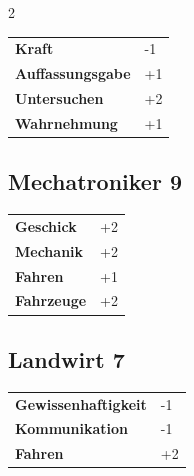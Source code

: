 \begin{multicols}{2}
\begin{tcolorbox}
\begin{tabular}{@{}ll@{}}
    \textbf{Kraft} & -1\\
    \textbf{Auffassungsgabe} & +1\\
    \textbf{Untersuchen} & +2\\
    \textbf{Wahrnehmung} & +1\\
\end{tabular}


\end{tcolorbox}

\begin{tcolorbox}
    \subsection*{Mechatroniker \hfill \small{9 }}
    \tcblower




\begin{tabular}{@{}ll@{}}
    \textbf{Geschick} & +2\\
    \textbf{Mechanik} & +2\\
    \textbf{Fahren} & +1\\
    \textbf{Fahrzeuge} & +2\\
\end{tabular}


\end{tcolorbox}

\begin{tcolorbox}
    \subsection*{Landwirt \hfill \small{7 }}
    \tcblower




\begin{tabular}{@{}ll@{}}
    \textbf{Gewissenhaftigkeit} & -1\\
    \textbf{Kommunikation} & -1\\
    \textbf{Fahren} & +2\\
\end{tabular}


\end{tcolorbox}
\end{multicols}
